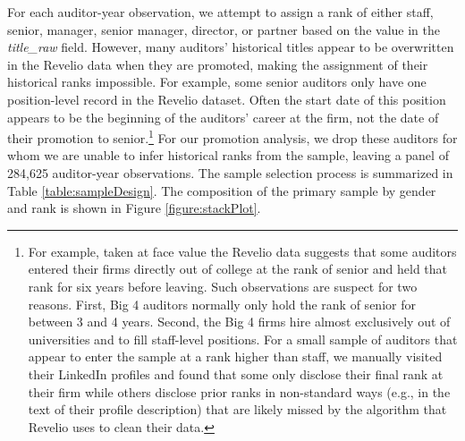 \documentclass[11pt]{article}
\begin{document}
        For each auditor-year observation, we attempt to assign a rank of either staff, senior, manager, senior manager, director, or partner based on the value in the \textit{title\_raw} field. However, many auditors' historical titles appear to be overwritten in the Revelio data when they are promoted, making the assignment of their historical ranks impossible. For example, some senior auditors only have one position-level record in the Revelio dataset. Often the start date of this position appears to be the beginning of the auditors' career at the firm, not the date of their promotion to senior.\footnote{For example, taken at face value the Revelio data suggests that some auditors entered their firms directly out of college at the rank of senior and held that rank for six years before leaving. Such observations are suspect for two reasons. First, Big 4 auditors normally only hold the rank of senior for between 3 and 4 years. Second, the Big 4 firms hire almost exclusively out of universities and to fill staff-level positions. For a small sample of auditors that appear to enter the sample at a rank higher than staff, we manually visited their LinkedIn profiles and found that some only disclose their final rank at their firm while others disclose prior ranks in non-standard ways (e.g., in the text of their profile description) that are likely missed by the algorithm that Revelio uses to clean their data.} For our promotion analysis, we drop these auditors for whom we are unable to infer historical ranks from the sample, leaving a panel of 284,625 auditor-year observations. The sample selection process is summarized in Table \ref{table:sampleDesign}. The composition of the primary sample by gender and rank is shown in Figure \ref{figure:stackPlot}.
        
\end{document}
